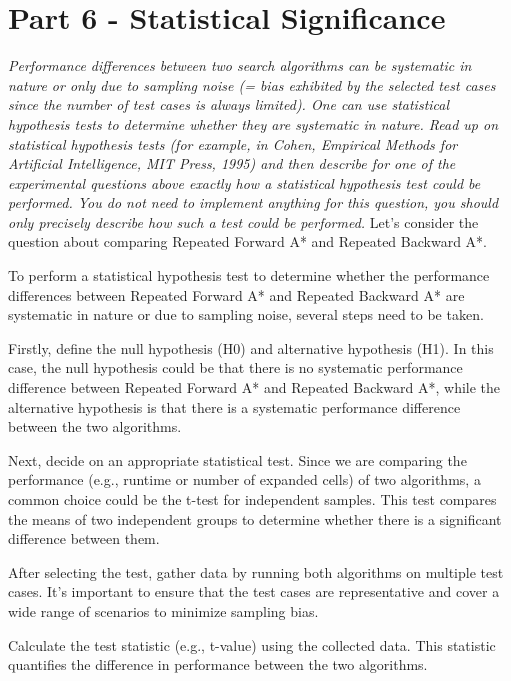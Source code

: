 \graphicspath{{Images/}}

\section{Part 6 - Statistical Significance }

\textit{Performance differences between two search algorithms can be systematic
in nature or only due to sampling noise (= bias exhibited by the selected test cases since the number of test cases is always
limited). One can use statistical hypothesis tests to determine whether they are systematic in nature. Read up on statistical
hypothesis tests (for example, in Cohen, Empirical Methods for Artificial Intelligence, MIT Press, 1995) and then describe
for one of the experimental questions above exactly how a statistical hypothesis test could be performed. You do not need
to implement anything for this question, you should only precisely describe how such a test could be performed.
}
Let's consider the question about comparing Repeated Forward A* and Repeated Backward A*.

To perform a statistical hypothesis test to determine whether the performance differences between Repeated Forward A* and Repeated Backward A* are systematic in nature or due to sampling noise, several steps need to be taken.

Firstly, define the null hypothesis (H0) and alternative hypothesis (H1). In this case, the null hypothesis could be that there is no systematic performance difference between Repeated Forward A* and Repeated Backward A*, while the alternative hypothesis is that there is a systematic performance difference between the two algorithms.

Next, decide on an appropriate statistical test. Since we are comparing the performance (e.g., runtime or number of expanded cells) of two algorithms, a common choice could be the t-test for independent samples. This test compares the means of two independent groups to determine whether there is a significant difference between them.

After selecting the test, gather data by running both algorithms on multiple test cases. It's important to ensure that the test cases are representative and cover a wide range of scenarios to minimize sampling bias.

Calculate the test statistic (e.g., t-value) using the collected data. This statistic quantifies the difference in performance between the two algorithms.

